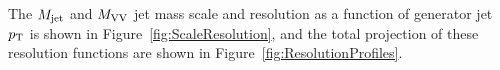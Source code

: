 The $M_{\rm jet}$ and $M_{\rm VV}$ jet mass scale and resolution as a function of generator jet $p_{\mathrm{T}}$ is shown in Figure~\ref{fig:ScaleResolution}, and the total projection of these resolution functions are shown in Figure~\ref{fig:ResolutionProfiles}.
\begin{figure}[h!]
\centering
{}
\\

\end{figure}
